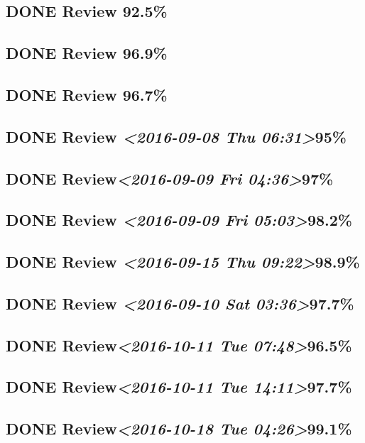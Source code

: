 \documentclass[11pt]{ctexart}
\begin{document}
\subsection{{\bfseries\sffamily DONE} Review 92.5\%}
\label{sec:org9e90ac6}
\subsection{{\bfseries\sffamily DONE} Review 96.9\%}
\label{sec:org045b355}
\subsection{{\bfseries\sffamily DONE} Review 96.7\%}
\label{sec:org55b4479}
\subsection{{\bfseries\sffamily DONE} Review \textit{<2016-09-08 Thu 06:31>}95\%}
\label{sec:org8265b67}
\subsection{{\bfseries\sffamily DONE} Review\textit{<2016-09-09 Fri 04:36>}97\%}
\label{sec:orgfa76afc}
\subsection{{\bfseries\sffamily DONE} Review \textit{<2016-09-09 Fri 05:03>}98.2\%}
\label{sec:org88648f1}
\subsection{{\bfseries\sffamily DONE} Review \textit{<2016-09-15 Thu 09:22>}98.9\%}
\label{sec:org7ee634f}
\subsection{{\bfseries\sffamily DONE} Review \textit{<2016-09-10 Sat 03:36>}97.7\%}
\label{sec:orgadd22bb}
\subsection{{\bfseries\sffamily DONE} Review\textit{<2016-10-11 Tue 07:48>}96.5\%}
\label{sec:org0ae9ae3}
\subsection{{\bfseries\sffamily DONE} Review\textit{<2016-10-11 Tue 14:11>}97.7\%}
\label{sec:org9f033b6}
\subsection{{\bfseries\sffamily DONE} Review\textit{<2016-10-18 Tue 04:26>}99.1\%}
\label{sec:org06d9d9b}
\end{document}
